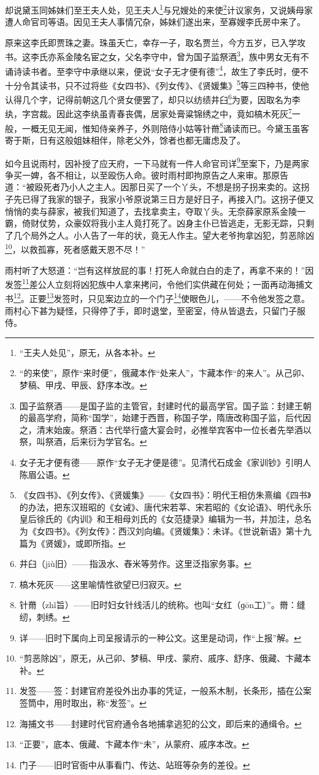 \par 却说黛玉同姊妹们至王夫人处，见王夫人\footnote{ “王夫人处见”，原无，从各本补。}与兄嫂处的来使\footnote{“的来使”，原作“来时便”，俄藏本作“处来人”，卞藏本作“的来人”。从己卯、梦稿、甲戌、甲辰、舒序本改。}计议家务，又说姨母家遭人命官司等语。因见王夫人事情冗杂，姊妹们遂出来，至寡嫂李氏房中来了。
\par 原来这李氏即贾珠之妻。珠虽夭亡，幸存一子，取名贾兰，今方五岁，已入学攻书。这李氏亦系金陵名宦之女，父名李守中，曾为国子监祭酒\footnote{国子监祭酒——是国子监的主管官，封建时代的最高学官。国子监：封建王朝的最高学府，简称“国学”，始建于西晋，称国子学，隋唐改称国子监，后代因之，清末始废。祭酒：古代举行盛大宴会时，必推举宾客中一位长者先举酒以祭，叫祭酒，后来衍为学官名。}，族中男女无有不诵诗读书者。至李守中承继以来，便说“女子无才便有德”\footnote{女子无才便有德——原作“女子无才便是德”。见清代石成金《家训钞》引明人陈眉公语。}，故生了李氏时，便不十分令其读书，只不过将些《女四书》、《列女传》、《贤媛集》\footnote{《女四书》、《列女传》、《贤媛集》——《女四书》：明代王相仿朱熹编《四书》的办法，把东汉班昭的《女诫》、唐代宋若莘、宋若昭的《女论语》、明代永乐皇后徐氏的《内训》和王相母刘氏的《女范捷录》编辑为一书，并加注，总名为《女四书》。《列女传》：西汉刘向编。《贤媛集》：未详。《世说新语》第十九篇为《贤媛》，或即所指。}等三四种书，使他认得几个字，记得前朝这几个贤女便罢了，却只以纺绩井臼\footnote{井臼（jiù旧）——指汲水、舂米等劳作。这里泛指家务事。}为要，因取名为李纨，字宫裁。因此这李纨虽青春丧偶，居家处膏粱锦绣之中，竟如槁木死灰\footnote{槁木死灰——这里喻情性欲望已归寂灭。}一般，一概无见无闻，惟知侍亲养子，外则陪侍小姑等针黹\footnote{针黹（zhǐ旨）——旧时妇女针线活儿的统称。也叫“女红（ɡōn工）”。黹：缝纫，刺绣。}诵读而已。今黛玉虽客寄于斯，日有这般姐妹相伴，除老父外，馀者也都无庸虑及了。
\par 如今且说雨村，因补授了应天府，一下马就有一件人命官司详\footnote{详——旧时下属向上司呈报请示的一种公文。这里是动词，作“上报”解。}至案下，乃是两家争买一婢，各不相让，以至殴伤人命。彼时雨村即拘原告之人来审。那原告道：“被殴死者乃小人之主人。因那日买了一个丫头，不想是拐子拐来卖的。这拐子先已得了我家的银子，我家小爷原说第三日方是好日子，再接入门。这拐子便又悄悄的卖与薛家，被我们知道了，去找拿卖主，夺取丫头。无奈薛家原系金陵一霸，倚财仗势，众豪奴将我小主人竟打死了。凶身主仆已皆逃走，无影无踪，只剩了几个局外之人。小人告了一年的状，竟无人作主。望大老爷拘拿凶犯，剪恶除凶\footnote{“剪恶除凶”，原无，从己卯、梦稿、甲戌、蒙府、戚序、舒序、俄藏、卞藏本补。}，以救孤寡，死者感戴天恩不尽！”
\par 雨村听了大怒道：“岂有这样放屁的事！打死人命就白白的走了，再拿不来的！”因发签\footnote{发签——签：封建官府差役外出办事的凭证，一般系木制，长条形，插在公案签筒中，用时取出，称“发签”。}差公人立刻将凶犯族中人拿来拷问，令他们实供藏在何处；一面再动海捕文书\footnote{海捕文书——封建时代官府通令各地捕拿逃犯的公文，即后来的通缉令。}。正要\footnote{“正要”，底本、俄藏、卞藏本作“未”，从蒙府、戚序本改。}发签时，只见案边立的一个门子\footnote{门子——旧时官衙中从事看门、传达、站班等杂务的差役。}使眼色儿，——不令他发签之意。雨村心下甚为疑怪，只得停了手，即时退堂，至密室，侍从皆退去，只留门子服侍。
